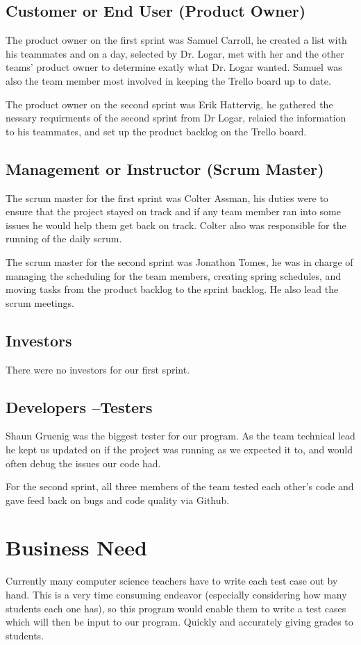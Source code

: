 \subsection{Customer or End User (Product Owner)}
The product owner on the first sprint was Samuel Carroll, he created a list with his teammates 
and on a day, selected by Dr. Logar, met with her and the other teams' product owner to determine
exatly what Dr. Logar wanted. Samuel was also the team member most involved in keeping the Trello 
board up to date.

The product owner on the second sprint was Erik Hattervig, he gathered the nessary requirments of the
second sprint from Dr Logar, relaied the information to his teammates, and set up the product backlog on
the Trello board.


\subsection{Management or Instructor (Scrum Master)}
The scrum master for the first sprint was Colter Assman, his duties were to ensure that the project 
stayed on track and if any team member ran into some issues he would help them get back on track.   
Colter also was responsible for the running of the daily scrum.

The scrum master for the second sprint was Jonathon Tomes,  he was in charge of managing the scheduling
for the team members, creating spring schedules, and moving tasks from the product backlog to the sprint backlog.
He also lead the scrum meetings.

\subsection{Investors}
There were no investors for our first sprint.


\subsection{Developers --Testers}
Shaun Gruenig was the biggest tester for our program.   As the team technical lead 
he kept us updated on if the project was running as we expected it to, and would 
often debug the issues our code had.

For the second sprint, all three members of the team tested each other's code and gave feed back on bugs and
code quality via Github.


\section{Business Need}
Currently many computer science teachers have to write each test case out by hand.   
This is a very time consuming endeavor (especially considering how many students each
one has), so this program would enable them to write a test cases which will then be input
to our program.   Quickly and accurately giving grades to students.

